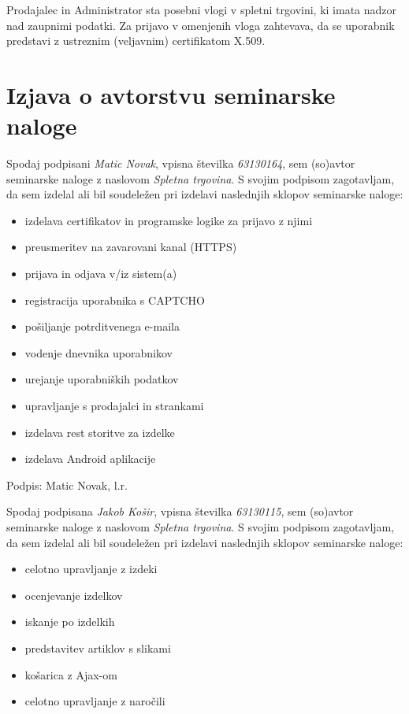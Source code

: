 \documentclass[a4paper,12pt]{report}
\newcommand{\naslov}     {Spletna trgovina}
\newcommand{\prviavtor}  {Matic Novak}
\newcommand{\prviindeks} {63130164}
\newcommand{\drugiavtor} {Jakob Košir}
\newcommand{\drugiindeks}{63130115}
\begin{document}
Prodajalec in Administrator sta posebni vlogi v spletni trgovini, ki imata nadzor nad zaupnimi podatki. Za prijavo v omenjenih vloga zahtevava, da se uporabnik predstavi z ustreznim (veljavnim) certifikatom X.509.

\chapter{Izjava o avtorstvu seminarske naloge}

Spodaj podpisani \textit{\prviavtor}, vpisna številka \textit{\prviindeks}, sem (so)avtor seminarske naloge z naslovom \textit{\naslov}. S svojim podpisom zagotavljam, da sem izdelal ali bil soudeležen pri izdelavi naslednjih sklopov seminarske naloge:
\begin{itemize}
	\item izdelava certifikatov in programske logike za prijavo z njimi
	\item preusmeritev na zavarovani kanal (HTTPS)
    \item prijava in odjava v/iz sistem(a)
    \item registracija uporabnika s CAPTCHO
    \item pošiljanje potrditvenega e-maila
    \item vodenje dnevnika uporabnikov
	\item urejanje uporabniških podatkov
	\item upravljanje s prodajalci in strankami
	\item izdelava rest storitve za izdelke
	\item izdelava Android aplikacije
	 
	 
\end{itemize}

Podpis: {\prviavtor}, l.r.

\newpage

Spodaj podpisana \textit{\drugiavtor}, vpisna številka \textit{\drugiindeks}, sem (so)avtor seminarske naloge z naslovom \textit{\naslov}. S svojim podpisom zagotavljam, da sem izdelal ali bil soudeležen pri izdelavi naslednjih sklopov seminarske naloge:
\begin{itemize}
	\item celotno upravljanje z izdeki
	\item ocenjevanje izdelkov
	\item iskanje po izdelkih
	\item predstavitev artiklov s slikami
    \item košarica z Ajax-om
	\item celotno upravljanje z naročili
\end{itemize}
\end{document}
